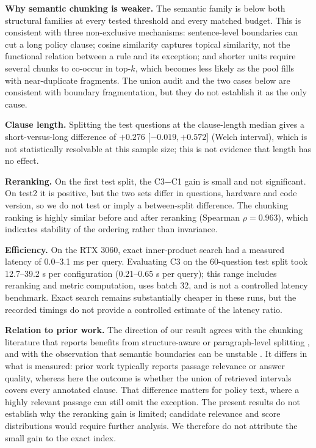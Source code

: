 \documentclass[conference]{IEEEtran}
\begin{document}
\textbf{Why semantic chunking is weaker.}
The semantic family is below both structural families at every tested threshold and every matched budget. This is consistent with three non-exclusive mechanisms: sentence-level boundaries can cut a long policy clause; cosine similarity captures topical similarity, not the functional relation between a rule and its exception; and shorter units require several chunks to co-occur in top-$k$, which becomes less likely as the pool fills with near-duplicate fragments. The union audit and the two cases below are consistent with boundary fragmentation, but they do not establish it as the only cause.

\textbf{Clause length.}
Splitting the test questions at the clause-length median gives a short-versus-long difference of $+0.276$ [$-0.019,+0.572$] (Welch interval), which is not statistically resolvable at this sample size; this is not evidence that length has no effect.

\textbf{Reranking.}
On the first test split, the C3$-$C1 gain is small and not significant. On test2 it is positive, but the two sets differ in questions, hardware and code version, so we do not test or imply a between-split difference. The chunking ranking is highly similar before and after reranking (Spearman $\rho=0.963$), which indicates stability of the ordering rather than invariance.

\textbf{Efficiency.}
On the RTX 3060, exact inner-product search had a measured latency of 0.0--3.1 ms per query. Evaluating C3 on the 60-question test split took 12.7--39.2 s per configuration (0.21--0.65 s per query); this range includes reranking and metric computation, uses batch 32, and is not a controlled latency benchmark. Exact search remains substantially cheaper in these runs, but the recorded timings do not provide a controlled estimate of the latency ratio.

\textbf{Relation to prior work.}
The direction of our result agrees with the chunking literature that reports benefits from structure-aware or paragraph-level splitting \cite{mazzitelli2025paragraph,khalib2026chunking}, and with the observation that semantic boundaries can be unstable \cite{kiss2025maxmin,moreno2026growing}. It differs in what is measured: prior work typically reports passage relevance or answer quality, whereas here the outcome is whether the union of retrieved intervals covers every annotated clause. That difference matters for policy text, where a highly relevant passage can still omit the exception. The present results do not establish why the reranking gain is limited; candidate relevance and score distributions would require further analysis. We therefore do not attribute the small gain to the exact index.
\end{document}
